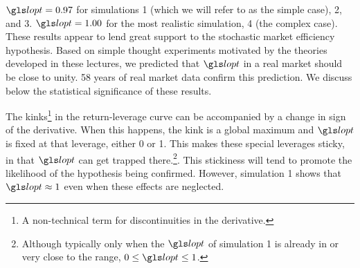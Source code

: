 $\lopt=0.97$ for simulations 1 (which we will refer to as the simple case), 2, and 3. $\lopt=1.00$ for the most realistic simulation, 4 (the complex case). These results appear to lend great support to the stochastic market efficiency hypothesis. Based on simple thought experiments motivated by the theories developed in these lectures, we predicted that $\lopt$ in a real market should be close to unity. 58 years of real market data confirm this prediction. We discuss below the statistical significance of these results.

The kinks\footnote{A non-technical term for discontinuities in the derivative.} in the return-leverage curve can be accompanied by a change in sign of the derivative. When this happens, the kink is a global maximum and $\lopt$ is fixed at that leverage, either 0 or 1. This makes these special leverages sticky, in that $\lopt$ can get trapped there.\footnote{Although typically only when the $\lopt$ of simulation 1 is already in or very close to the range, $0\leq\lopt\leq1$.}. This stickiness will tend to promote the likelihood of the hypothesis being confirmed. However, simulation 1 shows that $\lopt\approx1$ even when these effects are neglected.


